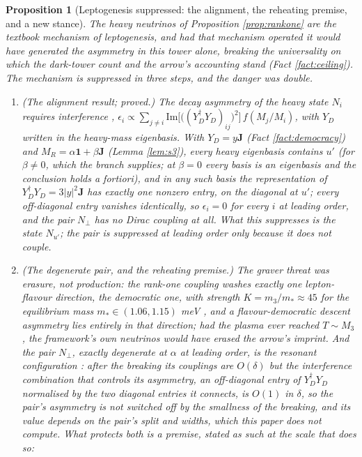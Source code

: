 \documentclass[11pt]{article}
\newtheorem{proposition}[theorem]{Proposition}
\theoremstyle{definition}
\newcommand{\J}{\mathbf{J}}
\begin{document}
\begin{proposition}[Leptogenesis suppressed: the alignment, the reheating premise, and a new stance]\label{prop:leptogenesis}
The heavy neutrinos of Proposition \ref{prop:rankone} are the textbook mechanism of leptogenesis, and had that mechanism operated it would have generated the asymmetry in this tower alone, breaking the universality on which the dark-tower count and the arrow's accounting stand (Fact \ref{fact:ceiling}). The mechanism is suppressed in three steps, and the danger was double.
\begin{enumerate}
\item \emph{(The alignment result; proved.)} The decay asymmetry of the heavy state $N_{i}$ requires interference \cite{FukugitaYanagida1986, DavidsonNardiNir2008}, $\epsilon_{i} \propto \sum_{j \neq i}\mathrm{Im}\bigl[\bigl((Y_{D}^{\dagger}Y_{D})_{ij}\bigr)^{2}\bigr]\,f(M_{j}/M_{i})$, with $Y_{D}$ written in the heavy-mass eigenbasis. With $Y_{D} = y\J$ (Fact \ref{fact:democracy}) and $M_{R} = \alpha\mathbf{1} + \beta\J$ (Lemma \ref{lem:s3}), every heavy eigenbasis contains $u'$ (for $\beta \neq 0$, which the branch supplies; at $\beta = 0$ every basis is an eigenbasis and the conclusion holds a fortiori), and in any such basis the representation of $Y_{D}^{\dagger}Y_{D} = 3|y|^{2}\J$ has exactly one nonzero entry, on the diagonal at $u'$; every off-diagonal entry vanishes identically, so $\epsilon_{i} = 0$ for every $i$ at leading order, and the pair $N_{\perp}$ has no Dirac coupling at all. What this suppresses is the state $N_{u'}$; the pair is suppressed at leading order only because it does not couple.
\item \emph{(The degenerate pair, and the reheating premise.)} The graver threat was erasure, not production: the rank-one coupling washes exactly one lepton-flavour direction, the democratic one, with strength $K = m_{3}/m_{*} \approx 45$ for the equilibrium mass $m_{*} \in (1.06, 1.15)$ meV \cite{DavidsonNardiNir2008}, and a flavour-democratic descent asymmetry lies entirely in that direction; had the plasma ever reached $T \sim M_{3}$, the framework's own neutrinos would have erased the arrow's imprint. And the pair $N_{\perp}$, exactly degenerate at $\alpha$ at leading order, is the resonant configuration \cite{PilaftsisUnderwood2004}: after the breaking its couplings are $O(\delta)$ but the interference combination that controls its asymmetry, an off-diagonal entry of $Y_{D}^{\dagger}Y_{D}$ normalised by the two diagonal entries it connects, is $O(1)$ in $\delta$, so the pair's asymmetry is not switched off by the smallness of the breaking, and its value depends on the pair's split and widths, which this paper does not compute. What protects both is a premise, stated as such at the scale that does so:

\end{enumerate}
\end{proposition}
\end{document}
